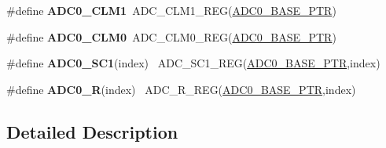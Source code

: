 \begin{DoxyCompactItemize}
\item 
\hypertarget{group___a_d_c___register___accessor___macros_ga18d9c7c3d402716526d6f90bcbe1811a}{}\#define {\bfseries A\+D\+C0\+\_\+\+C\+L\+M1}~A\+D\+C\+\_\+\+C\+L\+M1\+\_\+\+R\+E\+G(\hyperlink{group___a_d_c___peripheral_ga6cec2f227a3a37a9fccaa830740f1f5e}{A\+D\+C0\+\_\+\+B\+A\+S\+E\+\_\+\+P\+T\+R})\label{group___a_d_c___register___accessor___macros_ga18d9c7c3d402716526d6f90bcbe1811a}

\item 
\hypertarget{group___a_d_c___register___accessor___macros_ga5dca3dc10fac37b7fc668a9664da1607}{}\#define {\bfseries A\+D\+C0\+\_\+\+C\+L\+M0}~A\+D\+C\+\_\+\+C\+L\+M0\+\_\+\+R\+E\+G(\hyperlink{group___a_d_c___peripheral_ga6cec2f227a3a37a9fccaa830740f1f5e}{A\+D\+C0\+\_\+\+B\+A\+S\+E\+\_\+\+P\+T\+R})\label{group___a_d_c___register___accessor___macros_ga5dca3dc10fac37b7fc668a9664da1607}

\item 
\hypertarget{group___a_d_c___register___accessor___macros_ga571d83134f9795ec51da08a99c3cba8b}{}\#define {\bfseries A\+D\+C0\+\_\+\+S\+C1}(index)                                                ~A\+D\+C\+\_\+\+S\+C1\+\_\+\+R\+E\+G(\hyperlink{group___a_d_c___peripheral_ga6cec2f227a3a37a9fccaa830740f1f5e}{A\+D\+C0\+\_\+\+B\+A\+S\+E\+\_\+\+P\+T\+R},index)\label{group___a_d_c___register___accessor___macros_ga571d83134f9795ec51da08a99c3cba8b}

\item 
\hypertarget{group___a_d_c___register___accessor___macros_gaa8fc1f5b1e0ab4d1105f4f5b85f50d61}{}\#define {\bfseries A\+D\+C0\+\_\+\+R}(index)                                                    ~A\+D\+C\+\_\+\+R\+\_\+\+R\+E\+G(\hyperlink{group___a_d_c___peripheral_ga6cec2f227a3a37a9fccaa830740f1f5e}{A\+D\+C0\+\_\+\+B\+A\+S\+E\+\_\+\+P\+T\+R},index)\label{group___a_d_c___register___accessor___macros_gaa8fc1f5b1e0ab4d1105f4f5b85f50d61}

\end{DoxyCompactItemize}


\subsection{Detailed Description}
